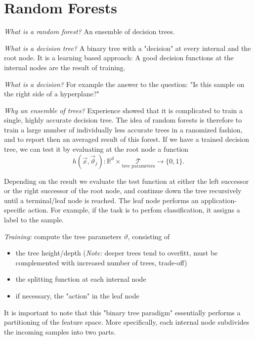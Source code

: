 \documentclass{scrartcl}
\begin{document}
\section{Random Forests}
\textit{What is a random forest?} An ensemble of decision trees.

\textit{What is a decision tree?} A binary tree with a "decision" at every internal and the root node. It is a learning based approach: A good decision functions at the internal nodes are the result of training.

\textit{What is a decision?} For example the answer to the question: "Is this sample on the right side of a hyperplane?"

\textit{Why an ensemble of trees?} Experience showed that it is complicated to train a single, highly accurate decision tree. The idea of random forests is therefore to train a large number of individually less accurate trees in a ranomized fashion, and to report then an averaged result of this forest. 
If we have a trained decision tree, we can test it by evaluating at the root node a function
\[h(\vec{x}, \vec{\vartheta}_j): \mathbb{R}^d \times \underset{\text{tree parameters}}{\mathcal{T}} \rightarrow \{0, 1\}.\]

Depending on the result we evaluate the test function at either the left successor or the right successor of the root node, and continue down the tree recursively until a terminal/leaf node is reached.
The leaf node performs an application-specific action. For example, if the task is to perfom classification, it assigns a label to the sample.


\textit{Training:} compute the tree parameters \(\vartheta\), consisting of
\begin{itemize}
    \item
        the tree height/depth (\textit{Note:} deeper trees tend to overfitt, must be complemented with increased number of trees, trade-off)
    \item
        the splitting function at each internal node
    \item
        if necessary, the "action" in the leaf node
\end{itemize}

It is important to note that this "binary tree paradigm" essentially performs a partitioning of the feature space. More specifically, each internal node subdivides the incoming samples into two parts.
\end{document}
